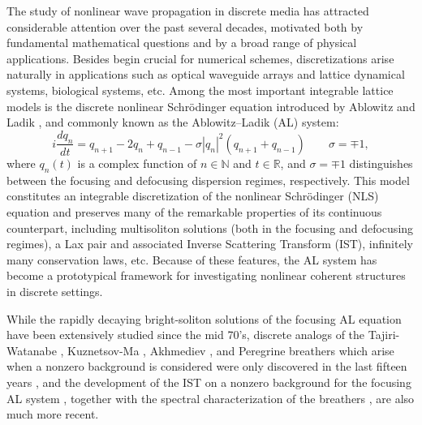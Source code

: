 \documentclass{article}
\def\Real{\mathbb{R}}
\begin{document}
The study of nonlinear wave propagation in discrete media has attracted considerable attention over the past several decades, motivated both by fundamental mathematical questions and by a broad range of physical applications. Besides begin crucial for numerical schemes, discretizations arise naturally in applications such as optical waveguide arrays and lattice dynamical systems, biological systems, etc.
Among the most important integrable lattice models is the discrete nonlinear Schr\"odinger equation introduced by Ablowitz and Ladik \cite{AL1,AL2}, and commonly known as the Ablowitz–Ladik (AL) system: 
\begin{equation}
\label{ALv2}
 i\frac{dq_n}{dt}=q_{n+1}-2q_n+q_{n-1}-\sigma |q_n|^2(q_{n+1}+q_{n-1}) \qquad \sigma=\mp 1,
\end{equation}
where $q_n(t)$ is a complex function of $n\in \mathbb{N}$ and $t\in \Real$, and $\sigma=\mp 1$ distinguishes between the focusing and defocusing dispersion regimes, respectively.
This model constitutes an integrable discretization of the nonlinear Schr\"odinger (NLS) equation \cite{ZS72,ZS73} and preserves many of the remarkable properties of its continuous counterpart, including multisoliton solutions (both in the focusing and defocusing regimes), a Lax pair and associated Inverse Scattering Transform (IST), infinitely many conservation laws, etc. Because of these features, the AL system has become a prototypical framework for investigating nonlinear coherent structures in discrete settings.

While the rapidly decaying bright-soliton solutions of the focusing AL equation have been extensively studied since the mid 70's,  discrete analogs of the Tajiri-Watanabe \cite{TW98}, Kuznetsov-Ma \cite{K77,Ma79}, Akhmediev \cite{Akhmediev1985Generation,Akhmediev1986Exact},
and Peregrine \cite{Peregrine83} breathers which arise when a nonzero background is considered were only discovered in the last fifteen years \cite{AASC2010,Ank13,Ankiewicz2014,OY14,MRC26}, and the development of the IST on a nonzero background for the focusing AL system \cite{PV16}, together with the spectral characterization of the breathers \cite{P16}, are also much more recent.
\end{document}
